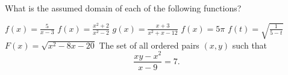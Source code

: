 \begin{exercises}
What is the assumed domain of each of the following functions?
\begin{exenum}
\sx
$f(x) = \frac{5}{x - 3}$
\sx
$f(x) = \frac{x^2 + 2}{x^2 -2}$
\sx
$g(x) = \frac{x+3}{x^2+x-12}$
\sx
$f(x) = 5\pi$
\sx
$f(t) = \sqrt{\frac{1}{5-t}}$
\sx
$F(x) = \sqrt{x^2 - 8x - 20}$
\sx
The set of all ordered pairs $(x,y)$ such that
\[
\frac{xy-x^2}{x-9}= 7.
\]
\end{exenum}

\end{exercises}
